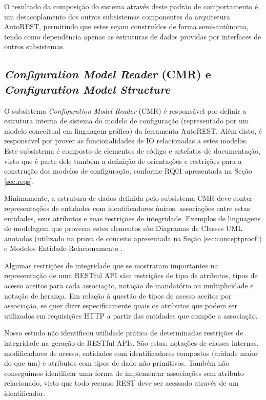 O resultado da composição do sistema através deste padrão de comportamento é um desacoplamento dos outros subsistemas componentes da arquitetura AutoREST, permitindo que estes sejam construídos de forma semi-autônoma, tendo como dependência apenas as estruturas de dados providas por interfaces de outros subsistemas.


\subsection{\textit{Configuration Model Reader} (CMR) e \textit{Configuration Model Structure}}
\label{sec:cmr}

O subsistema \textit{Configuration Model Reader} (CMR) é responsável por definir a estrutura interna de sistema do modelo de configuração (representado por um modelo conceitual em linguagem gráfica) da ferramenta AutoREST. Além disto, é responsável por prover as funcionalidades de IO relacionadas a estes modelos. Este subsistema é composto de elementos de código e artefatos de documentação, visto que é parte dele também a definição de orientações e restrições para a construção dos modelos de configuração, conforme RQ01 apresentada na Seção \ref{sec:reqs}.

Minimamente, a estrutura de dados definida pelo subsistema CMR deve conter representações de entidades com identificadores únicos, associações entre estas entidades, seus atributos e suas restrições de integridade. Exemplos de linguagens de modelagem que proveem estes elementos são Diagramas de Classes UML anotados (utilizado na prova de conceito apresentada na Seção \ref{sec:conceptproof}) e Modelos Entidade-Relacionamento \cite{POLAK:2015} \cite{VALVERDE:2009}.

Algumas restrições de integridade que se mostraram importantes na representação de uma RESTful API são: restrições de tipo de atributos, tipos de acesso aceitos para cada associação, notação de mandatório ou multiplicidade e notação de herança. Em relação à questão de tipos de acesso aceitos por associação, se quer dizer especificamente quais os atributos que podem ser utilizados em requisições HTTP a partir das entidades que compõe a associação.

Nosso estudo não identificou utilidade prática de determinadas restrições de integridade na geração de RESTful APIs. São estas: notações de classes internas, modificadores de acesso, entidades com identificadores compostos (aridade maior do que um) e atributos com tipos de dado não primitivos. Também não conseguimos identificar uma forma de implementar associações sem atributo relacionado, visto que todo recurso REST deve ser acessado através de um identificador.

